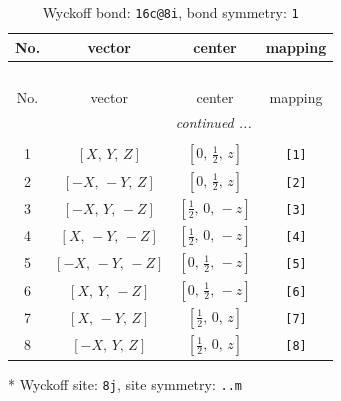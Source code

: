 \documentclass[fleqn,8pt]{jsarticle}
\begin{document}
\renewcommand{\arraystretch}{1.2}
\begin{longtable}{cccc}
\caption{Wyckoff bond: {\tt 16c@8i}, bond symmetry: {\tt 1}}
 \\
 \hline \hline
No. & vector & center & mapping \\ \hline \endfirsthead

\multicolumn{3}{l}{\tablename\ \thetable{}} \\
 \hline \hline
No. & vector & center & mapping \\ \hline \endhead

 \hline \hline
\multicolumn{3}{r}{\footnotesize\it continued ...} \\ \endfoot

 \hline \hline
\multicolumn{3}{r}{} \\ \endlastfoot

1 & $\left[ X,\, Y,\, Z \right]$ & $\left[ 0,\, \frac{1}{2},\, z \right]$ & {\tt [1]} \\ \hline
2 & $\left[ - X,\, - Y,\, Z \right]$ & $\left[ 0,\, \frac{1}{2},\, z \right]$ & {\tt [2]} \\ \hline
3 & $\left[ - X,\, Y,\, - Z \right]$ & $\left[ \frac{1}{2},\, 0,\, - z \right]$ & {\tt [3]} \\ \hline
4 & $\left[ X,\, - Y,\, - Z \right]$ & $\left[ \frac{1}{2},\, 0,\, - z \right]$ & {\tt [4]} \\ \hline
5 & $\left[ - X,\, - Y,\, - Z \right]$ & $\left[ 0,\, \frac{1}{2},\, - z \right]$ & {\tt [5]} \\ \hline
6 & $\left[ X,\, Y,\, - Z \right]$ & $\left[ 0,\, \frac{1}{2},\, - z \right]$ & {\tt [6]} \\ \hline
7 & $\left[ X,\, - Y,\, Z \right]$ & $\left[ \frac{1}{2},\, 0,\, z \right]$ & {\tt [7]} \\ \hline
8 & $\left[ - X,\, Y,\, Z \right]$ & $\left[ \frac{1}{2},\, 0,\, z \right]$ & {\tt [8]} \\
\end{longtable}
* Wyckoff site: {\tt 8j}, site symmetry: {\tt ..m}
\renewcommand{\arraystretch}{1.2}
\end{document}
